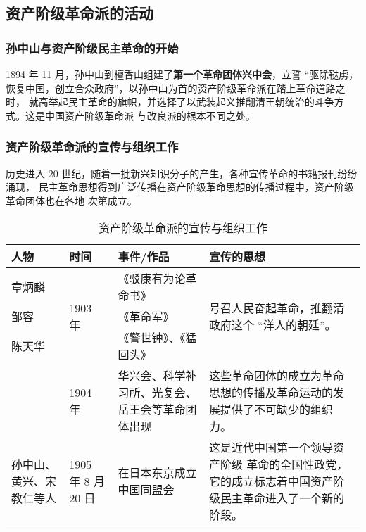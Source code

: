 \documentclass[10pt, UTF8]{ctexbook} %
\begin{document}
\subsection{资产阶级革命派的活动}

\subsubsection{孙中山与资产阶级民主革命的开始}

1894 年 11 月，孙中山到檀香山组建了\textbf{第一个革命团体兴中会}，立誓
“驱除鞑虏，恢复中国，创立合众政府”，以孙中山为首的资产阶级革命派在踏上革命道路之时，
就高举起民主革命的旗帜，并选择了以武装起义推翻清王朝统治的斗争方式。这是中国资产阶级革命派
与改良派的根本不同之处。




\subsubsection{资产阶级革命派的宣传与组织工作}

历史进入 20 世纪，随着一批新兴知识分子的产生，各种宣传革命的书籍报刊纷纷涌现，
民主革命思想得到广泛传播在资产阶级革命思想的传播过程中，资产阶级革命团体也在各地
次第成立。

\begin{table}[H]
    \centering
    \caption{资产阶级革命派的宣传与组织工作}
    \begin{tabular}{p{}|p{}|p{}|p{}}
        \toprule
        人物 & 时间 & 事件/作品 & 宣传的思想 \\ 
        \hline
        章炳麟 & \multirow{3}{*}{1903 年} & 《驳康有为论革命书》
        & \multirow{3}{0.3\textwidth}{号召人民奋起革命，推翻清政府这个 “洋人的朝廷”。}\\
        邹容 &  & 《革命军》&\\
        陈天华 & & 《警世钟》、《猛回头》&\\
        \hline
        & 1904 年 & 华兴会、科学补习所、光复会、岳王会等革命团体出现 &
        这些革命团体的成立为革命思想的传播及革命运动的发展提供了不可缺少的组织力。 \\
        \hline
        孙中山、黄兴、宋教仁等人 & 1905 年 8 月 20 日 & 在日本东京成立中国同盟会 
        & 这是近代中国第一个领导资产阶级
        革命的全国性政党，它的成立标志着中国资产阶级民主革命进入了一个新的阶段。 \\
        \bottomrule
    \end{tabular}    
\end{table}
\end{document}
